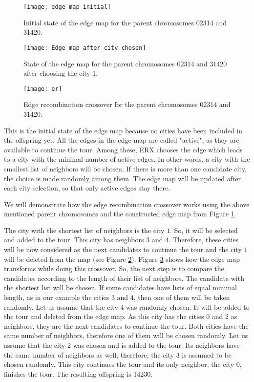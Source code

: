 \begin{figure}[htp] \centering
	\centering
	\texttt{[image: edge\_map\_initial]}
	\caption{Initial state of the edge map for the parent chromosomes 02314 and 31420.}
	\label{edge_map_initial}
\end{figure}

\begin{figure}[htp] \centering
	\centering
	\texttt{[image: Edge\_map\_after\_city\_chosen]}
	\caption{State of the edge map for the parent chromosomes 02314 and 31420 after choosing the city 1.}
	\label{Edge_map_after_city_chosen}
\end{figure}

\begin{figure}[htp] \centering
	\centering
	\texttt{[image: er]}
	\caption{Edge recombination crossover for the parent chromosomes 02314 and 31420.}
	\label{er}
\end{figure}

This is the initial state of the edge map because no cities have been included in the offspring yet. All the edges in the edge map are called "active", as they are available to continue the tour. Among these, ERX chooses the edge which leads to a city with the minimal number of active edges. In other words, a city with the smallest list of neighbors will be chosen. If there is more than one candidate city, the choice is made randomly among them. The edge map will be updated after each city selection, so that only active edges stay there.\par

We will demonstrate how the edge recombination crossover works using the above mentioned parent chromosomes and the constructed edge map from Figure \ref{edge_map_initial}.\par 

The city with the shortest list of neighbors is the city $1$. So, it will be selected and added to the tour. This city has neighbors $3$ and $4$. Therefore, these cities will be now considered as the next candidates to continue the tour and the city $1$ will be deleted from the map (see Figure \ref{Edge_map_after_city_chosen}). Figure \ref{er} shows how the edge map transforms while doing this crossover. So, the next step is to compare  the candidates according to the length of their list of neighbors. The candidate with the shortest list will be chosen. If some candidates have lists of equal minimal length, as in our example the cities $3$ and $4$, then one of them will be taken randomly. Let us assume that the city $4$ was randomly chosen. It will be added to the tour and deleted from the edge map. As this city has the cities $0$ and $2$ as neighbors, they are the next candidates to continue the tour. Both cities have the same number of neighbors, therefore one of them will be chosen randomly. Let us assume that the city $2$ was chosen and is added to the tour. Its neighbors have the same number of neighbors as well; therefore, the city $3$ is assumed to be chosen randomly. This city continues the tour and its only neighbor, the city $0$, finishes the tour. The resulting offspring is 14230.\par